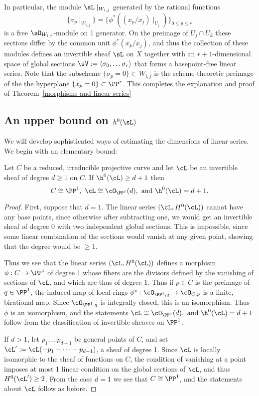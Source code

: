 In particular, the module $\sL\mid_{W_{i,j}}$ generated by the rational functions 
$$
\{\sigma_p\mid_{W_{i,j}}\}= 
\{\phi^*((x_p/x_j)\mid_{U_j})\}
_{0\leq p\leq r}
$$
 is a free $\sO_{W_{i,j}}$-module on 1 generator. On the preimage of $U_j\cap U_k$ these sections differ by the common unit $\phi^*(x_k/x_j)$, and thus the collection of these modules defines an invertible sheaf $\sL$ on $X$ together with an
$r+1$-dimensional space of global sections $\sV := \langle \sigma_0,\dots \sigma_r\rangle$ that forms a basepoint-free linear series. Note that the subscheme  $\{\sigma_p = 0\} \subset W_{i,j}$  is the scheme-theoretic preimage of the
the hyperplane $\{x_p = 0\}\subset \PP^r$. This completes the explanation and proof of Theorem~\ref{morphisms and linear series}

\subsection{An upper bound on $h^0(\sL)$}

We will develop sophisticated ways of estimating the dimensions of linear series. We begin with an elementary bound:

\begin{theorem}\label{characterization of P1}
Let $C$ be a reduced, irreducible projective curve and let $\cL$ be an invertible sheaf of degree $d\geq 1$ on $C$. If $\h^0(\cL) \geq d+1$ then
$$C \cong \PP^1,\ \cL \cong \cO_{\PP^1}(d), \hbox{ and  } \h^0(\cL) = d+1.
$$
\end{theorem}

\begin{proof}
First, suppose that $d=1$. The linear series $(\cL, H^0(\cL))$ cannot have any base points, since
otherwise after subtracting one, we would get an invertible sheaf of degree $0$ with two independent global sections. This is impossible, since some linear combination of the sections would vanish at any given point, showing that the degree would be
$\geq 1$.

Thus we see that the linear series $(\cL, H^0(\cL))$ defines a morphism $\phi: C\to \PP^1$ of degree 1 whose fibers are the divisors defined by
the vanishing of sections of $\cL$, and which are thus of degree 1. Thus if $p\in C$ is the preimage of $q\in \PP^1$, the induced map of local rings
$\phi^*:\cO_{\PP^1, q} \to \cO_{C, p}$ is a finite, birational map. Since $\cO_{\PP^1, q}$ is integrally closed, this is an isomorphism. Thus 
$\phi$ is an isomorphism, and the statements $\cL \cong \cO_{\PP^1}(d), \hbox{ and  } \h^0(\cL) = d+1$ follow from the classification of invertible sheaves on $\PP^1$. 

If $d>1$, let $p_1,\dots p_{d-1}$ be general points of $C$, and set $\cL':=\cL(-p_1-\cdots-p_{d-1})$, a sheaf of degree 1.
 Since $\cL$ is locally isomorphic to the sheaf of functions on $C$, the condition of vanishing at a point imposes at most 1 linear condition on 
the global sections of $\cL$, and thus $H^0(\cL') \geq 2$. From the case $d=1$ we see that $C\cong \PP^1$, and the statements
about $\cL$ follow as before.
 \end{proof}


